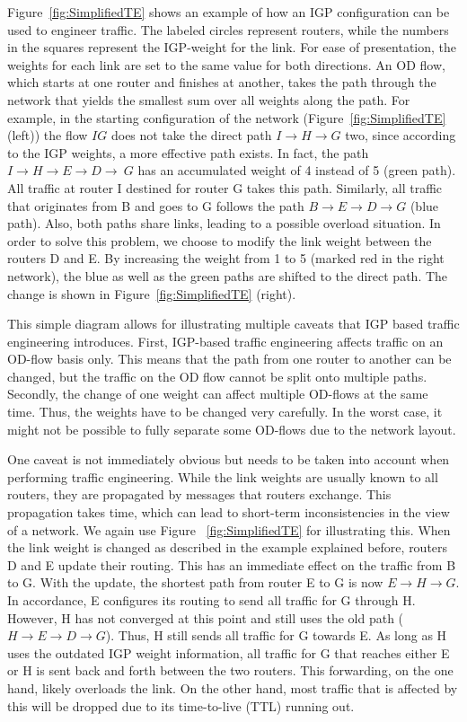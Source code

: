 Figure~\ref{fig:SimplifiedTE} shows an example of how an IGP configuration can
be used to engineer traffic. The labeled circles represent routers, while the
numbers in the squares represent the IGP-weight for the link. For ease of
presentation, the weights for each link are set to the same value for both
directions. An OD flow, which starts at one router and finishes at another,
takes the path through the network that yields the smallest sum over all
weights along the path. For example, in the starting configuration of the
network (Figure~\ref {fig:SimplifiedTE} (left)) the flow $IG$ does not take the
direct path $I \rightarrow H \rightarrow G$ two, since according to the IGP
weights, a more effective path exists. In fact, the path $I \rightarrow H
\rightarrow E \rightarrow D \rightarrow \ G$ has an accumulated weight of 4
instead of 5 (green path). All traffic at router I destined for router G takes
this path. Similarly, all traffic that originates from B and goes to G follows
the path $B \rightarrow E \rightarrow D \rightarrow G$ (blue path). Also, both
paths share links, leading to a possible overload situation. In order to solve
this problem, we choose to modify the link weight between the routers D and E.
By increasing the weight from 1 to 5 (marked red in the right network), the
blue as well as the green paths are shifted to the direct path. The change is
shown in Figure~\ref{fig:SimplifiedTE} (right).

This simple diagram allows for illustrating multiple caveats that IGP based
traffic engineering introduces. First, IGP-based traffic engineering affects
traffic on an OD-flow basis only. This means that the path from one router to
another can be changed, but the traffic on the OD flow cannot be split onto
multiple paths. Secondly, the change of one weight can affect multiple OD-flows
at the same time. Thus, the weights have to be changed very carefully. In the
worst case, it might not be possible to fully separate some OD-flows due to the
network layout.

One caveat is not immediately obvious but needs to be taken into account when
performing traffic engineering. While the link weights are usually known to all
routers, they are propagated by messages that routers exchange. This
propagation takes time, which can lead to short-term inconsistencies in the
view of a network. We again use Figure~ \ref{fig:SimplifiedTE} for illustrating
this. When the link weight is changed as described in the example explained
before, routers D and E update their routing. This has an immediate effect on
the traffic from B to G. With the update, the shortest path from router E to G
is now $E \rightarrow H \rightarrow G$. In accordance, E configures its routing
to send all traffic for G through H. However, H has not converged at this point
and still uses the old path ($H \rightarrow E \rightarrow D \rightarrow G$).
Thus, H still sends all traffic for G towards E. As long as H uses the outdated
IGP weight information, all traffic for G that reaches either E or H is sent
back and forth between the two routers. This forwarding, on the one hand,
likely overloads the link. On the other hand, most traffic that is affected by
this will be dropped due to its time-to-live (TTL) running out.

